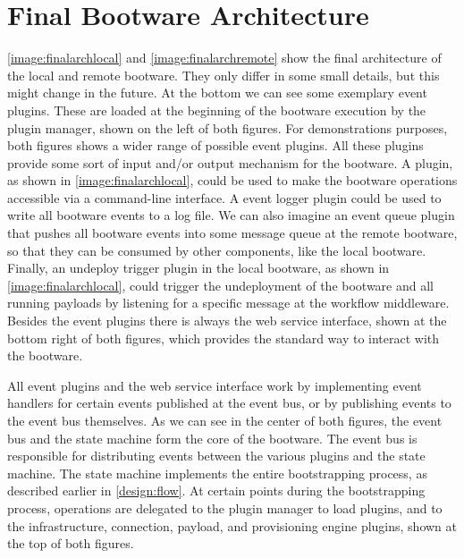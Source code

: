 \section{Final Bootware Architecture}
\label{design:finalarch}

\autoref{image:finalarchlocal} and \autoref{image:finalarchremote} show the final architecture of the local and remote bootware.
They only differ in some small details, but this might change in the future.
At the bottom we can see some exemplary event plugins.
These are loaded at the beginning of the bootware execution by the plugin manager, shown on the left of both figures.
For demonstrations purposes, both figures shows a wider range of possible event plugins.
All these plugins provide some sort of input and/or output mechanism for the bootware.
A  plugin, as shown in \autoref{image:finalarchlocal}, could be used to make the bootware operations accessible via a command-line interface.
A event logger plugin could be used to write all bootware events to a log file.
We can also imagine an event queue plugin that pushes all bootware events into some message queue at the remote bootware, so that they can be consumed by other components, like the local bootware.
Finally, an undeploy trigger plugin in the local bootware, as shown in \autoref{image:finalarchlocal}, could trigger the undeployment of the bootware and all running payloads by listening for a specific message at the workflow middleware.
Besides the event plugins there is always the web service interface, shown at the bottom right of both figures, which provides the standard way to interact with the bootware.

All event plugins and the web service interface work by implementing event handlers for certain events published at the event bus, or by publishing events to the event bus themselves.
As we can see in the center of both figures, the event bus and the state machine form the core of the bootware.
The event bus is responsible for distributing events between the various plugins and the state machine.
The state machine implements the entire bootstrapping process, as described earlier in \autoref{design:flow}.
At certain points during the bootstrapping process, operations are delegated to the plugin manager to load plugins, and to the infrastructure, connection, payload, and provisioning engine plugins, shown at the top of both figures.


